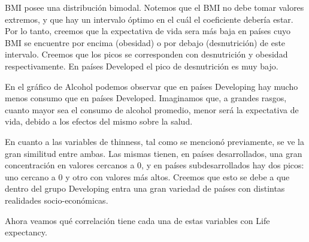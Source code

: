 \begin{itemize}
        BMI posee una distribución bimodal. Notemos que el BMI no debe tomar valores extremos, y que hay un intervalo óptimo en el cuál el coeficiente debería estar. Por lo tanto, creemos que la expectativa de vida sera más baja en países cuyo BMI se encuentre por encima (obesidad) o por debajo (desnutrición) de este intervalo. Creemos que los picos se corresponden con desnutrición y obesidad respectivamente. En países Developed el pico de desnutrición es muy bajo.
        
        En el gráfico de Alcohol podemos observar que en países Developing hay mucho menos consumo que en países Developed. Imaginamos que, a grandes rasgos, cuanto mayor sea el consumo de alcohol promedio, menor será la expectativa de vida, debido a los efectos del mismo sobre la salud.
        
        En cuanto a las variables de thinness, tal como se mencionó previamente, se ve la gran similitud entre ambas. Las mismas tienen, en países desarrollados, una gran concentración en valores cercanos a 0, y en países subdesarrollados hay dos picos: uno cercano a 0 y otro con valores más altos. Creemos que esto se debe a que dentro del grupo Developing entra una gran variedad de países con distintas realidades socio-económicas.
        
    Ahora veamos qué correlación tiene cada una de estas variables con Life expectancy.
    

\end{itemize}
